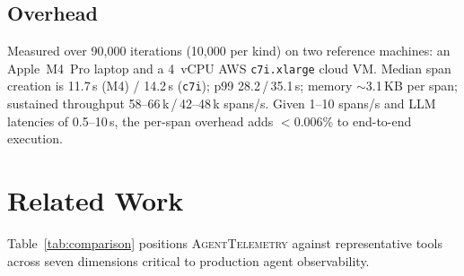 \documentclass[sigconf,review]{acmart}
\begin{document}
\subsection{Overhead}

Measured over 90{,}000 iterations (10{,}000 per kind) on two reference
machines: an Apple~M4~Pro laptop and a 4~vCPU AWS \texttt{c7i.xlarge}
cloud VM.  Median span creation is 11.7\,\textmu s (M4) /
14.2\,\textmu s (\texttt{c7i}); p99 28.2\,/\,35.1\,\textmu s; memory
$\sim$3.1\,KB per span; sustained throughput 58--66\,k\,/\,42--48\,k
spans/s.  Given 1--10 spans/s and LLM latencies of 0.5--10\,s, the
per-span overhead adds $<$0.006\% to end-to-end execution.

\section{Related Work}
\label{sec:related}

Table~\ref{tab:comparison} positions \textsc{AgentTelemetry} against
representative tools across seven dimensions critical to production
agent observability.
\end{document}

